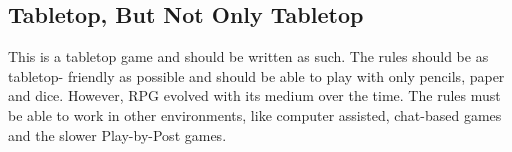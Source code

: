 \begin{multicols}{2}
\subsection{Tabletop, But Not Only Tabletop}
This is a tabletop game and should be
written as such. The rules should be as tabletop-
friendly as possible and should be able to play with
only pencils, paper and dice. However, RPG
evolved with its medium over the time. The rules
must be able to work in other environments, like
computer assisted, chat-based games and the
slower Play-by-Post games.

\end{multicols}